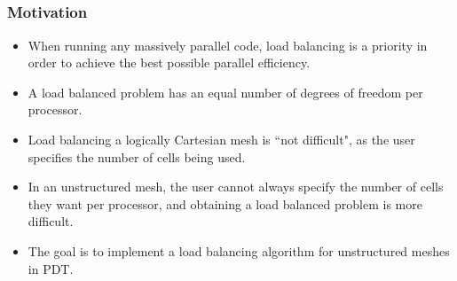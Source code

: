\documentclass[]{beamer}
\begin{document}
\subsection{}
\begin{frame}[t]\frametitle{Motivation}
	\begin{block}{}
	\begin{itemize}
		\item When running any massively parallel code, load balancing is a priority in order to achieve the best possible parallel efficiency.
		\item  A load balanced problem has an equal number of degrees of freedom per processor.
		\item Load balancing a logically Cartesian mesh is ``not difficult", as the user specifies the number of cells being used.
		\item In an unstructured mesh, the user cannot always specify the number of cells they want per processor, and obtaining a load balanced problem is more difficult.
		\item The goal is to implement a load balancing algorithm for unstructured meshes in PDT.
	\end{itemize}
	\end{block}
\end{frame}
\end{document}
